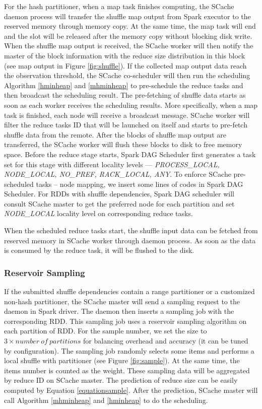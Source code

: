 For the hash partitioner, when a map task finishes computing, the SCache daemon process will transfer the shuffle map output from Spark executor to the reserved memory through memory copy.
At the same time, the map task will end and the slot will be released after the memory copy without blocking disk write.
When the shuffle map output is received, the SCache worker will then notify the master of the block information with the reduce size distribution in this block (see map output in Figure \ref{fig:shuffle}).
If the collected map output data reach the observation threshold, the SCache co-scheduler will then run the scheduling Algorithm \ref{hminheap} and \ref{mhminheap} to pre-schedule the reduce tasks and then broadcast the scheduling result.
The pre-fetching of shuffle data starts as soon as each worker receives the scheduling results.
More specifically, when a map task is finished, each node will receive a broadcast message. SCache worker will filter the reduce tasks ID that will be launched on itself and starts to pre-fetch shuffle data from the remote. After the blocks of shuffle map output are transferred, the SCache worker will flush these blocks to disk to free memory space.
Before the reduce stage starts, Spark DAG Scheduler first generates a task set for this stage with different locality levels --- \textit{PROCESS\_LOCAL, NODE\_LOCAL, NO\_PREF, RACK\_LOCAL, ANY}.
To enforce SCache pre-scheduled tasks -- node mapping, we insert some lines of codes in Spark DAG Scheduler.
For RDDs with shuffle dependencies, Spark DAG scheduler will consult SCache master to get the preferred node for each partition and set \textit{NODE\_LOCAL} locality level on corresponding reduce tasks.

When the scheduled reduce tasks start, the shuffle input data can be fetched from reserved memory in SCache worker through daemon process. As soon as the data is consumed by the reduce task, it will be flushed to the disk.

\subsubsection{Reservoir Sampling}\label{sampling}
If the submitted shuffle dependencies contain a range partitioner or a customized non-hash partitioner, the SCache master will send a sampling request to the daemon in Spark driver. The daemon then inserts a sampling job with the corresponding RDD. This sampling job uses a reservoir sampling algorithm \cite{reservoir} on each partition of RDD. For the sample number, we set the size to $3 \times number\ of\ partitions$ for balancing overhead and accuracy (it can be tuned by configuration). The sampling job randomly selects some items and performs a local shuffle with partitioner (see Figure \ref{fig:sample}). At the same time, the items number is counted as the weight. These sampling data will be aggregated by reduce ID on SCache master. The prediction of reduce size can be easily computed by Equation \ref{equationsample}. After the prediction, SCache master will call Algorithm \ref{mhminheap} and \ref{hminheap} to do the scheduling.

